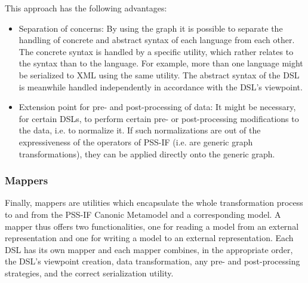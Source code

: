 This approach has the following advantages:

\begin{itemize}
\item Separation of concerns: By using the graph it is possible to separate the handling of concrete and abstract syntax of each language from each other. The concrete syntax is handled by a specific utility, which rather relates to the syntax than to the language. For example, more than one language might be serialized to XML using the same utility. The abstract syntax of the DSL is meanwhile handled independently in accordance with the DSL's viewpoint.
\item Extension point for pre- and post-processing of data: It might be necessary, for certain DSLs, to perform certain pre- or post-processing modifications to the data, i.e. to normalize it. If such normalizations are out of the expressiveness of the operators of PSS-IF (i.e. are generic graph transformations), they can be applied directly onto the generic graph.
\end{itemize}

\subsubsection{Mappers}

Finally, mappers are utilities which encapsulate the whole transformation process to and from the PSS-IF Canonic Metamodel and a corresponding model. A mapper thus offers two functionalities, one for reading a model from an external representation and one for writing a model to an external representation. Each DSL has its own mapper and each mapper combines, in the appropriate order, the DSL's viewpoint creation, data transformation, any pre- and post-processing strategies, and the correct serialization utility.